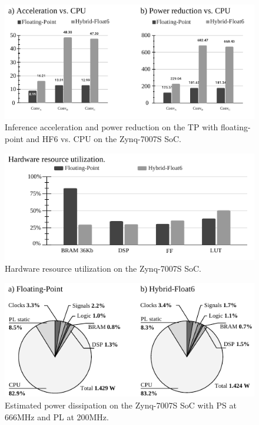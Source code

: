 \begin{figure}[t!]
	\centering
	\includegraphics[width=1\columnwidth]{../figures/power_breakdown/acceleration_power_reduction.pdf}
	\caption{Inference acceleration and power reduction on the TP with floating-point and HF6 vs. CPU on the Zynq-7007S SoC.}
	\label{fig:acceleration}
\end{figure}

\begin{figure}[t!]
	\centering
	\includegraphics[width=1\columnwidth]{../figures/power_breakdown/resource_utilization.pdf}
	\caption{Hardware resource utilization on the Zynq-7007S SoC.}
	\label{fig:resource_utilization}
\end{figure}

\begin{figure}[t!]
	\centering
	\includegraphics[width=1\columnwidth]{../figures/power_breakdown/power_breakdown.pdf}
	\caption{Estimated power dissipation on the Zynq-7007S SoC with PS at 666MHz and PL at 200MHz.}
	\label{fig:power}
\end{figure}